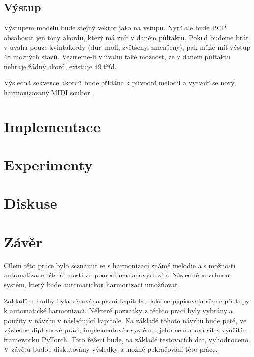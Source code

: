 \section{Výstup}
Výstupem modelu bude stejný vektor jako na vstupu.
Nyní ale bude PCP obsahovat jen tóny akordu, 
který má znít v daném půltaktu.
Pokud budeme brát v úvahu pouze kvintakordy (dur, moll, zvětšený, zmenšený),
pak může mít výstup 48 možných stavů.
Vezmeme-li v úvahu také možnost, že v daném půltaktu nehraje žádný akord,
existuje 49 tříd.
\par

Výsledná sekvence akordů bude přidána k původní melodii
a vytvoří se nový, harmonizovaný MIDI soubor.




\chapter{Implementace}

\chapter{Experimenty}

\chapter{Diskuse}

\chapter{Závěr}
\label{zaver}
Cílem této práce bylo seznámit se s harmonizací známé melodie a s možností automatizace této činnosti za pomoci neuronových sítí.
Následně navrhnout systém, který bude automatickou harmonizaci umožňovat.
\par

Základům hudby byla věnována první kapitola, 
další se popisovala různé přístupy k automatické harmonizaci. Některé poznatky z těchto prací byly vybrány a použity v návrhu v následující kapitole.
Na základě tohoto návrhu bude poté, ve výsledné diplomové práci, implementován systém a jeho neuronová síť s využitím frameworku PyTorch.
Toto řešení bude, na základě testovacích dat, vyhodnoceno.
V závěru budou diskutovány výsledky a možné pokračování této práce.
